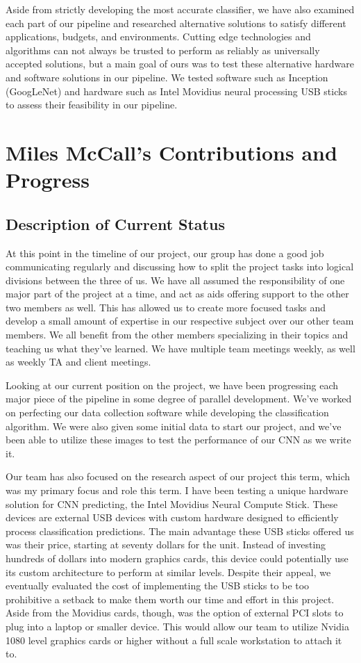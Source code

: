 \documentclass[draftclsnofoot, onecolumn, 10pt, compsoc]{IEEEtran}
\begin{document}
Aside from strictly developing the most accurate classifier, we have also examined each part of our pipeline and researched alternative solutions to satisfy different applications, budgets, and environments. Cutting edge technologies and algorithms can not always be trusted to perform as reliably as universally accepted solutions, but a main goal of ours was to test these alternative hardware and software solutions in our pipeline. We tested software such as Inception (GoogLeNet) and hardware such as Intel Movidius neural processing USB sticks to assess their feasibility in our pipeline. 


\section{Miles McCall's Contributions and Progress}
\subsection{Description of Current Status}
At this point in the timeline of our project, our group has done a good job communicating regularly and discussing how to split the project tasks into logical divisions between the three of us. We have all assumed the responsibility of one major part of the project at a time, and act as aids offering support to the other two members as well. This has allowed us to create more focused tasks and develop a small amount of expertise in our respective subject over our other team members. We all benefit from the other members specializing in their topics and teaching us what they've learned. We have multiple team meetings weekly, as well as weekly TA and client meetings. 

Looking at our current position on the project, we have been progressing each major piece of the pipeline in some degree of parallel development. We've worked on perfecting our data collection software while developing the classification algorithm. We were also given some initial data to start our project, and we've been able to utilize these images to test the performance of our CNN as we write it. 

Our team has also focused on the research aspect of our project this term, which was my primary focus and role this term. I have been testing a unique hardware solution for CNN predicting, the Intel Movidius Neural Compute Stick. These devices are external USB devices with custom hardware designed to efficiently process classification predictions. The main advantage these USB sticks offered us was their price, starting at seventy dollars for the unit. Instead of investing hundreds of dollars into modern graphics cards, this device could potentially use its custom architecture to perform at similar levels. Despite their appeal, we eventually evaluated the cost of implementing the USB sticks to be too prohibitive a setback to make them worth our time and effort in this project. Aside from the Movidius cards, though, was the option of external PCI slots to plug into a laptop or smaller device. This would allow our team to utilize Nvidia 1080 level graphics cards or higher without a full scale workstation to attach it to. 
\end{document}

